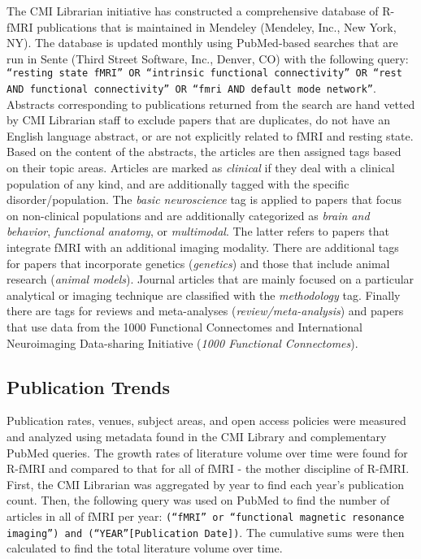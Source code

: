 \documentclass[12pt,3p,review,number]{elsarticle}
\begin{document}
The CMI Librarian initiative has constructed a comprehensive database of R-fMRI
publications that is maintained in Mendeley (Mendeley, Inc., New York, NY). The
database is updated monthly using PubMed-based searches that are run in Sente
(Third Street Software, Inc., Denver, CO) with the following query:
\texttt{``resting state fMRI'' OR ``intrinsic functional connectivity'' OR
``rest AND functional connectivity'' OR ``fmri AND default mode network''}.
Abstracts corresponding to publications returned from the search are hand vetted
by CMI Librarian staff to exclude papers that are duplicates, do not have an
English language abstract, or are not explicitly related to fMRI and resting
state. Based on the content of the abstracts, the articles are then assigned
tags based on their topic areas.  Articles are marked as \emph{clinical} if they
deal with a clinical population of any kind, and are additionally tagged with
the specific disorder/population. The \emph{basic neuroscience} tag is applied
to papers that focus on non-clinical populations and are additionally
categorized as \emph{brain and behavior}, \emph{functional anatomy}, or
\emph{multimodal}. The latter refers to papers that integrate fMRI with an
additional imaging modality. There are additional tags for papers that
incorporate genetics (\emph{genetics}) and those that include animal research
(\emph{animal models}). Journal articles that are mainly focused on a particular
analytical or imaging technique are classified with the \emph{methodology} tag.
Finally there are tags for reviews and meta-analyses
(\emph{review/meta-analysis}) and papers that use data from the 1000 Functional
Connectomes and International Neuroimaging Data-sharing Initiative (\emph{1000
Functional Connectomes}). 

\subsection{Publication Trends}
Publication rates, venues, subject areas, and open access policies were measured
and analyzed using metadata found in the CMI Library and complementary PubMed
queries. The growth rates of literature volume over time were found for R-fMRI
and compared to that for all of fMRI - the mother discipline of
R-fMRI. First, the CMI Librarian was aggregated by year to find each year’s
publication count. Then, the following query was used on PubMed to find the
number of articles in all of fMRI per year: \texttt{(``fMRI'' or ``functional
magnetic resonance imaging'') and (``YEAR''[Publication Date])}.  The cumulative
sums were then calculated to find the total literature volume over time.
\end{document}
